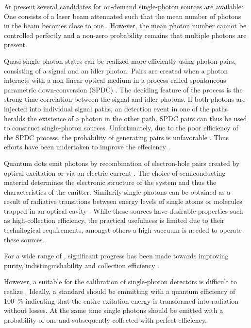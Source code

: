 	At present several candidates for on-demand single-photon sources are available: One consists of a laser beam attenuated such that the mean number of photons in the beam becomes close to one \cite{Vaigu2017::6, Vaigu2017::7, Vaigu2017::8}. However, the mean photon number cannot be controlled perfectly and a non-zero probability remains that multiple photons are present.

	Quasi-single photon states can be realized more efficiently using photon-pairs, consisting of a signal and an idler photon. Pairs are created when a photon interacts with a non-linear optical medium in a process called spontaneous parametric down-conversion (SPDC) \cite{Shih, Yanhua (2003). Entangled biphoton source - property and preparation, Vaigu2017::9, Vaigu2017::10, Vaigu2017::11, Vaigu2017::12}. The deciding feature of the process is the strong time-correlation between the signal and idler photons. If both photons are injected into individual signal paths, an detection event in one of the paths heralds the existence of a photon in the other path. SPDC pairs can thus be used to construct single-photon sources. Unfortunately, due to the poor efficiency of the SPDC process, the probability of generating pairs is unfavorable \cite{zwinckels::paper, Bock2016}. Thus efforts have been undertaken to improve the effeciency \cite{Bock2016, zwinckels::112, zwinckels::113}.

	Quantum dots emit photons by recombination of electron-hole pairs created by optical excitation or via an electric current \cite{zwinckels::115, Vaigu2017::18, Vaigu2017::15}. The choice of semiconducting material determines the electronic structure of the system and thus the characteristics of the emitter. Similarily single-photons can be obtained as a result of radiative transitions between energy levels of single atoms or molecules trapped in an optical cavity \cite{zwickels::116}. While these sources have desirable properties such as high-collection efficiency, the practical usefulness is limited due to their technilogical requirements, amongst others a high vaccuum is needed to operate these sources \cite{zwickels::paper}.

	For a wide range of \spss, significant progress has been made towards improving purity, indistinguishability and collection efficiency \cite{Vaigu2017::21, Vaigu2017::22, Vaigu2017::23, Vaigu2017::24, Vaigu2017::25}.

	However, a \sps suitable for the calibration of single-photon detectors is difficult to realize \cite{Vaigu2017::paper}. Ideally, a standard \sps should be emmitting with a quantum efficiency of \SI{100}{\percent} indicating that the entire exitation energy is transformed into radiation without losses. At the same time single photons should be emitted with a probability of one and subsequently collected with perfect efficiency.

